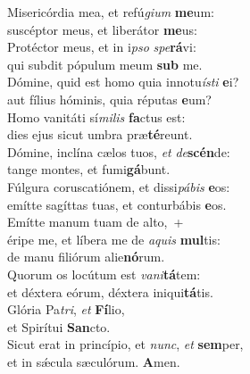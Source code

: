 \evenverse Misericórdia mea, et refú\textit{gi}\textit{um} \textbf{me}um:~\*\\
\evenverse suscéptor meus, et liberátor \textbf{me}us:\\
\oddverse Protéctor meus, et in i\textit{pso} \textit{spe}\textbf{rá}vi:~\*\\
\oddverse qui subdit pópulum meum \textbf{sub} me.\\
\evenverse Dómine, quid est homo quia innotu\textit{í}\textit{sti} \textbf{e}i?~\*\\
\evenverse aut fílius hóminis, quia réputas \textbf{e}um?\\
\oddverse Homo vanitáti sí\textit{mi}\textit{lis} \textbf{fa}ctus est:~\*\\
\oddverse dies ejus sicut umbra præ\textbf{té}reunt.\\
\evenverse Dómine, inclína cælos tuos, \textit{et} \textit{de}\textbf{scén}de:~\*\\
\evenverse tange montes, et fumi\textbf{gá}bunt.\\
\oddverse Fúlgura coruscatiónem, et dissi\textit{pá}\textit{bis} \textbf{e}os:~\*\\
\oddverse emítte sagíttas tuas, et conturbábis \textbf{e}os.\\
\evenverse Emítte manum tuam de alto,~+\\
\evenverse  éripe me, et líbera me de \textit{a}\textit{quis} \textbf{mul}tis:~\*\\
\evenverse de manu filiórum alie\textbf{nó}rum.\\
\oddverse Quorum os locútum est \textit{va}\textit{ni}\textbf{tá}tem:~\*\\
\oddverse et déxtera eórum, déxtera iniqui\textbf{tá}tis.\\
\evenverse Glória Pa\textit{tri}, \textit{et} \textbf{Fí}lio,~\*\\
\evenverse et Spirítui \textbf{San}cto.\\
\oddverse Sicut erat in princípio, et \textit{nunc}, \textit{et} \textbf{sem}per,~\*\\
\oddverse et in sǽcula sæculórum. \textbf{A}men.\\
